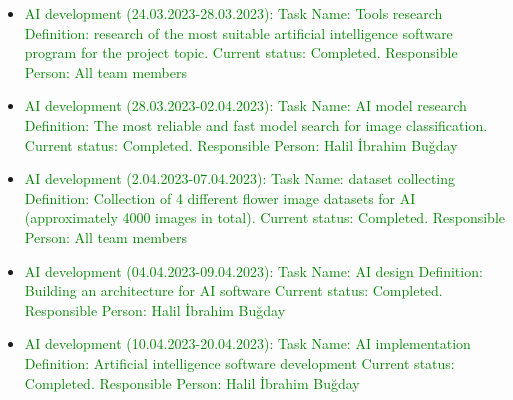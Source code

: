 \documentclass[conference]{IEEEtran}
\begin{document}
\begin{itemize}
  \item \textcolor{green} { AI development (24.03.2023-28.03.2023):\newline\newline
  Task Name: Tools research\newline
  Definition: research of the most suitable artificial intelligence software program for the project topic.\newline
  Current status: Completed.\newline
  Responsible Person: All team members\newline\newline
  }
  
  \item \textcolor{green} {AI development (28.03.2023-02.04.2023):\newline\newline
  Task Name: AI model research\newline
  Definition: The most reliable and fast model search for image classification.\newline
  Current status: Completed.\newline
  Responsible Person: Halil İbrahim Buğday\newline
}
  \item \textcolor{green} {AI development (2.04.2023-07.04.2023):\newline\newline
  Task Name: dataset collecting\newline
  Definition:  Collection of 4 different flower image datasets for AI (approximately 4000 images in total).\newline
  Current status: Completed.\newline
  Responsible Person: All team members\newline
}
\item \textcolor{green} {AI development (04.04.2023-09.04.2023):\newline\newline
  Task Name: AI design\newline
  Definition: Building an architecture for AI software\newline
  Current status: Completed.\newline
  Responsible Person: Halil İbrahim Buğday\newline
  }
  \item \textcolor{green} {AI development (10.04.2023-20.04.2023):\newline\newline
  Task Name: AI implementation\newline
  Definition: Artificial intelligence software development\newline
  Current status: Completed.\newline 
  Responsible Person: Halil İbrahim Buğday\newline
  }
  

\end{itemize}
\end{document}
